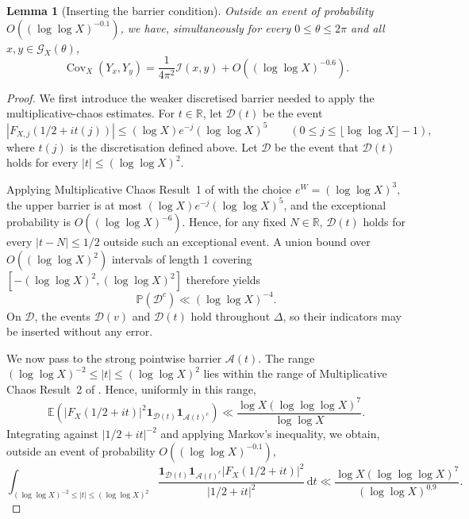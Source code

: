 \documentclass[a4paper,12pt,reqno]{amsart}
\numberwithin{equation}{section}
\newtheorem{lemma}[theorem]{Lemma}
\theoremstyle{remark}
\newcommand{\E}{\mathbb{E}}
\newcommand{\p}{\mathbb{P}}
\newcommand{\cov}{\operatorname{Cov}}
\begin{document}
\begin{lemma}[Inserting the barrier condition]
\label{lem:cov-barrier}
Outside an event of probability $O((\log\log X)^{-0.1})$, we have,
simultaneously for every $0\leq\theta\leq2\pi$ and all
$x,y\in{\mathcal G}_X(\theta)$,
\[
 \cov_X(Y_x,Y_y)=\frac1{4\pi^2}{\mathcal I}(x,y)
 +O((\log\log X)^{-0.6}).
\]
\end{lemma}
\begin{proof}
We first introduce the weaker discretised barrier needed to apply the
multiplicative-chaos estimates.  For $t\in\mathbb R$, let
${\mathcal D}(t)$ be the event
\[
 |F_{X,j}(1/2+it(j))|
 \leq(\log X)e^{-j}(\log\log X)^5
 \qquad
 (0\leq j\leq\lfloor\log\log X\rfloor-1),
\]
where $t(j)$ is the discretisation defined above.  Let ${\mathcal D}$ be
the event that ${\mathcal D}(t)$ holds for every
$|t|\leq(\log\log X)^2$.

Applying Multiplicative Chaos Result~1 of
\cite[Section~2.4]{Harper2023Large} with the choice
\(
 e^W=(\log\log X)^3,
\)
the upper barrier is at most
$(\log X)e^{-j}(\log\log X)^5$, and the exceptional probability is
$O((\log\log X)^{-6})$.  Hence, for any fixed $N\in\mathbb R$,
${\mathcal D}(t)$ holds for every $|t-N|\leq1/2$ outside such an
exceptional event.  A union bound over
$O((\log\log X)^2)$ intervals of length 1 covering
$[-(\log\log X)^2,(\log\log X)^2]$ therefore yields
\[
 \p({\mathcal D}^c)\ll(\log\log X)^{-4}.
\]
On ${\mathcal D}$, the events ${\mathcal D}(v)$ and ${\mathcal D}(t)$
hold throughout $\Delta$, so their indicators may be inserted without
any error.

We now pass to the strong pointwise barrier ${\mathcal A}(t)$.  The range
\(
 (\log\log X)^{-2}\leq|t|\leq(\log\log X)^2
\)
lies within the  range of Multiplicative Chaos Result~2 of
\cite[Section~2.4]{Harper2023Large}.  Hence, uniformly in this range,
\begin{equation}\label{eq:pointwise-A-failure}
 \E\left(
 |F_X(1/2+it)|^2
 \mathbf 1_{{\mathcal D}(t)}
 \mathbf 1_{{\mathcal A}(t)^c}
 \right)
 \ll
 \frac{\log X(\log\log\log X)^7}{\log\log X}.
\end{equation}
Integrating against $|1/2+it|^{-2}$ and applying Markov's inequality,
we obtain, outside an event of probability
$O((\log\log X)^{-0.1})$,
\begin{equation}\label{eq:A-failure-energy}
 \int_{(\log\log X)^{-2}\leq|t|\leq(\log\log X)^2}
 \frac{
 \mathbf 1_{{\mathcal D}(t)}
 \mathbf 1_{{\mathcal A}(t)^c}
 |F_X(1/2+it)|^2}
 {|1/2+it|^2}\,\mathrm{d}t
 \ll
 \frac{\log X(\log\log\log X)^7}
 {(\log\log X)^{0.9}}.
\end{equation}


\end{proof}
\end{document}
